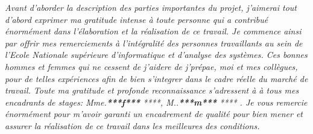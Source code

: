\documentclass[a4paper]{report}
\begin{document}
\begin{doublespace}

    \textit{
        Avant d'aborder la description des parties importantes du projet, j'aimerai tout d’abord exprimer ma gratitude
        intense à toute personne qui a contribué énormément dans l'élaboration et la réalisation de ce travail. Je commence
        ainsi par offrir mes remerciements à l'intégralité des personnes travaillants au sein de l’Ecole Nationale supérieure
        d’informatique et d’analyse des systèmes. Ces bonnes hommes et femmes qui ne cessent de j'aidere de j'prépae, moi et
        mes collègues, pour de telles expériences afin de bien s'integrer dans le cadre réelle du marché de travail.
        Toute ma gratitude et profonde reconnaissance s’adressent à à tous mes encadrants de stages: Mme.\textbf{***f***} ****,
        M..\textbf{***m***} ****   . Je vous remercie énormément pour m'avoir garanti un encadrement de qualité pour bien mener
        et assurer la réalisation de ce travail dans les meilleures des conditions.
    }

\end{doublespace}
\end{document}
